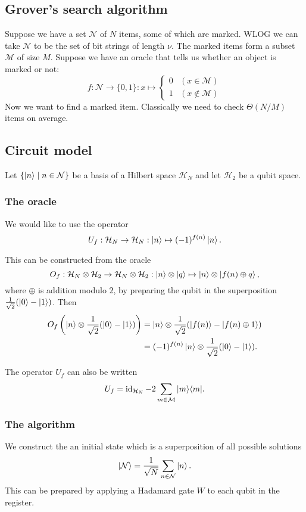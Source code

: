 \subsection{Grover's search algorithm}
Suppose we have a set $\mathcal{N}$ of $N$ items, some of which are marked. WLOG we can take $\mathcal{N}$ to be the set of bit strings of length $\nu$. The marked items form a subset $\mathcal{M}$ of size $M$. Suppose we have an oracle that tells us whether an object is marked or not:
\[ f:\mathcal{N} \to \{0,1\}: x\mapsto \begin{cases}
0 & (x\in \mathcal{M}) \\
1 & (x\notin \mathcal{M})
\end{cases} \]
Now we want to find a marked item. Classically we need to check $\Theta(N/M)$ items on average.

\subsection{Circuit model}
Let $\left\{ \left| n \right\rangle \;\middle|\; n\in\mathcal{N} \right\}$ be a basis of a Hilbert space $\mathcal{H}_N$ and let $\mathcal{H}_2$ be a qubit space.

\subsubsection{The oracle}
We would like to use the operator
\[ U_f: \mathcal{H}_N\to \mathcal{H}_N: \left| n \right\rangle\mapsto (-1)^{f(n)}\left| n \right\rangle. \]

This can be constructed from the oracle
\[ O_f: \mathcal{H}_N\otimes \mathcal{H}_2 \to \mathcal{H}_N\otimes \mathcal{H}_2: \left| n \right\rangle\otimes \left| q \right\rangle\mapsto \left| n \right\rangle\otimes\left| f(n)\oplus q \right\rangle, \]
where $\oplus$ is addition modulo $2$, by preparing the qubit in the superposition $\frac{1}{\sqrt{2}}(\left| 0 \right\rangle-\left| 1 \right\rangle)$. Then
\begin{align*}
O_f\left(\left| n \right\rangle\otimes \frac{1}{\sqrt{2}}(\left| 0 \right\rangle-\left| 1 \right\rangle)\right)
&= \left| n \right\rangle\otimes \frac{1}{\sqrt{2}}(\left| f(n) \right\rangle-\left| f(n)\oplus 1 \right\rangle) \\
&= (-1)^{f(n)}\left| n \right\rangle\otimes \frac{1}{\sqrt{2}}(\left| 0 \right\rangle-\left| 1 \right\rangle).
\end{align*}

The operator $U_f$ can also be written
\[ U_f = \operatorname{id}_{\mathcal{H}_N} - 2\sum_{m\in\mathcal{M}}|m\rangle\langle m|. \]

\subsubsection{The algorithm}
We construct the an initial state which is a superposition of all possible solutions
\[ \left| \mathcal{N} \right\rangle = \frac{1}{\sqrt{N}}\sum_{n\in\mathcal{N}}\left| n \right\rangle. \]
This can be prepared by applying a Hadamard gate $W$ to each qubit in the register.

